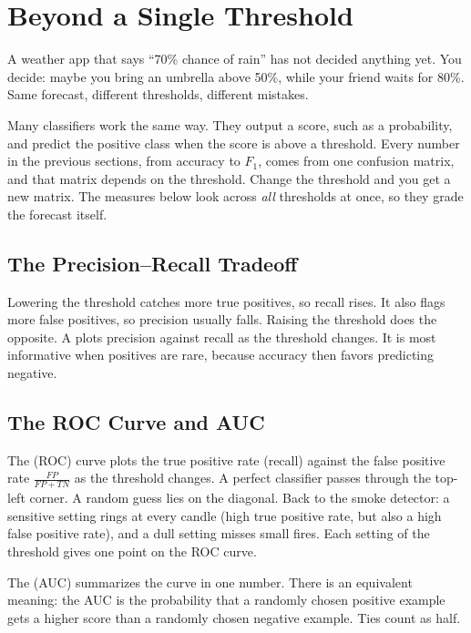 \section{Beyond a Single Threshold}
A weather app that says ``70\% chance of rain'' has not decided anything yet.
You decide: maybe you bring an umbrella above 50\%, while your friend waits for
80\%. Same forecast, different thresholds, different mistakes.

Many classifiers work the same way. They output a score, such as a
probability, and predict the positive class when the score is above a
threshold. Every number in the previous sections, from accuracy to $F_1$,
comes from one confusion matrix, and that matrix depends on the threshold.
Change the threshold and you get a new matrix. The measures below look across
\emph{all} thresholds at once, so they grade the forecast itself.

\subsection{The Precision--Recall Tradeoff}
Lowering the threshold catches more true positives, so recall rises. It also flags more false positives, so precision
usually falls. Raising the threshold does the opposite. A  plots precision against
recall as the threshold changes. It is most informative when positives are rare, because accuracy then favors
predicting negative.

\subsection{The ROC Curve and AUC}
The  (ROC) curve plots the true positive rate (recall) against the false
positive rate $\frac{FP}{FP + TN}$ as the threshold changes. A perfect classifier passes through the top-left corner.
A random guess lies on the diagonal. Back to the smoke detector: a sensitive
setting rings at every candle (high true positive rate, but also a high false
positive rate), and a dull setting misses small fires. Each setting of the
threshold gives one point on the ROC curve.

The  (AUC) summarizes the curve in one number. There is an equivalent meaning:
the AUC is the probability that a randomly chosen positive example gets a higher score than a randomly chosen
negative example. Ties count as half.

